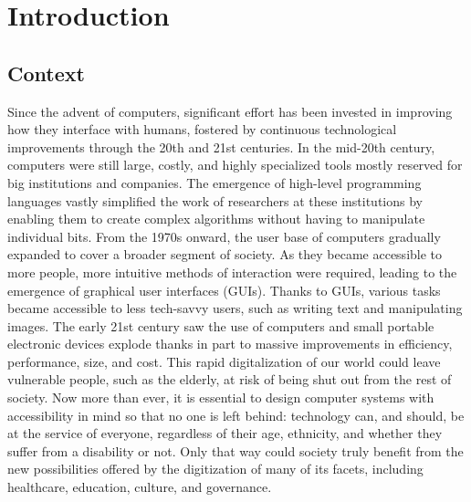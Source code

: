 \chapter{Introduction} \label{chap:introduction}
\section{Context} \label{sec:introduction:context}
Since the advent of computers, significant effort has been invested in improving how they interface with humans, fostered by continuous technological improvements through the 20th and 21st centuries.
%
In the mid-20th century, computers were still large, costly, and highly specialized tools mostly reserved for big institutions and companies. The emergence of high-level programming languages vastly simplified the work of researchers at these institutions by enabling them to create complex algorithms without having to manipulate individual bits. 
%
From the 1970s onward, the user base of computers gradually expanded to cover a broader segment of society. As they became accessible to more people, more intuitive methods of interaction were required, leading to the emergence of graphical user interfaces (GUIs).
%
Thanks to GUIs, various tasks became accessible to less tech-savvy users, such as writing text and manipulating images.
%
The early 21st century saw the use of computers and small portable electronic devices explode thanks in part to massive improvements in efficiency, performance, size, and cost. 
%
This rapid digitalization of our world could leave vulnerable people, such as the elderly, at risk of being shut out from the rest of society. Now more than ever, it is essential to design computer systems with accessibility in mind so that no one is left behind: technology can, and should, be at the service of everyone, regardless of their age, ethnicity, and whether they suffer from a disability or not. Only that way could society truly benefit from the new possibilities offered by the digitization of many of its facets, including healthcare, education, culture, and governance.

